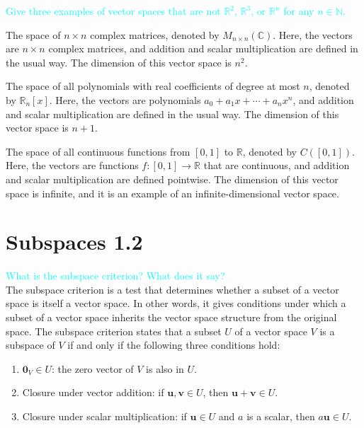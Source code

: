 \documentclass[fontsize=12pt]{scrartcl}
\begin{document}
\noindent
\textcolor{cyan}{Give three examples of vector spaces that are not $\mathbb{R}^2$, $\mathbb{R}^3$, or $\mathbb{R}^n$ for any $n \in \mathbb{N}$.}

The space of $n \times n$ complex matrices, denoted by $M_{n \times n}(\mathbb{C})$. Here, the vectors are $n \times n$ complex matrices, and addition and scalar multiplication are defined in the usual way. The dimension of this vector space is $n^2$.

The space of all polynomials with real coefficients of degree at most $n$, denoted by $\mathbb{R}_n[x]$. Here, the vectors are polynomials $a_0+a_1x+\cdots+a_nx^n$, and addition and scalar multiplication are defined in the usual way. The dimension of this vector space is $n+1$.

The space of all continuous functions from $[0,1]$ to $\mathbb{R}$, denoted by $C([0,1])$. Here, the vectors are functions $f : [0,1] \to \mathbb{R}$ that are continuous, and addition and scalar multiplication are defined pointwise. The dimension of this vector space is infinite, and it is an example of an infinite-dimensional vector space.

\newpage

\section{Subspaces 1.2}

\textcolor{cyan}{What is the subspace criterion? What does it say?}\\

The subspace criterion is a test that determines whether a subset of a vector space is itself a vector space. In other words, it gives conditions under which a subset of a vector space inherits the vector space structure from the original space. The subspace criterion states that a subset $U$ of a vector space $V$ is a subspace of $V$ if and only if the following three conditions hold:

\begin{enumerate}
	\item $\mathbf{0}_V\in U$: the zero vector of $V$ is also in $U$.
	\item Closure under vector addition: if $\mathbf{u},\mathbf{v}\in U$, then $\mathbf{u}+\mathbf{v}\in U$.
	\item Closure under scalar multiplication: if $\mathbf{u}\in U$ and $a$ is a scalar, then $a\mathbf{u}\in U$.
\end{enumerate}
\end{document}
